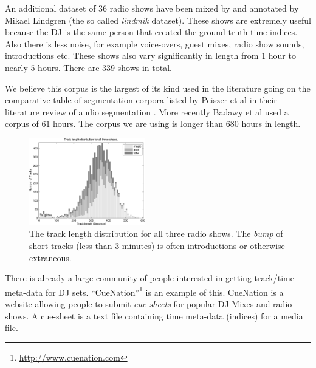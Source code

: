 \documentclass[twocolumn]{article}
\begin{document}
	An additional dataset of $36$ radio shows have been mixed by and annotated by Mikael Lindgren (the so called \textit{lindmik} dataset). These shows are extremely useful because the DJ is the same person that created the ground truth time indices. Also there is less noise, for example voice-overs, guest mixes, radio show sounds, introductions etc. These shows also vary significantly in length from $1$ hour to nearly $5$ hours. There are $339$ shows in total.
	
	We believe this corpus is the largest of its kind used in the literature going on the comparative table of segmentation corpora listed by Peiszer et al in their literature review of audio segmentation \cite{peiszer2008automatic}. More recently Badawy et al \citep{elaudio} used a corpus of $61$ hours. The corpus we are using is longer than $680$ hours in length. 
	
	\begin{figure}
		\centering
		\includegraphics[width=0.45\textwidth]{images/tracklength}
		
		\caption{The track length distribution for all three radio shows. The \textit{bump} of short tracks (less than $3$ minutes) is often introductions or otherwise extraneous.}
		\label{fig:tracklengths}
	\end{figure} 
	
	There is already a large community of people interested in getting track/time meta-data for DJ sets. ``CueNation''\footnote{\url{http://www.cuenation.com}} is an example of this. CueNation is a website allowing people to submit \textit{cue-sheets} for popular DJ Mixes and radio shows. A cue-sheet is a text file containing time meta-data (indices) for a media file.
	
\end{document}
